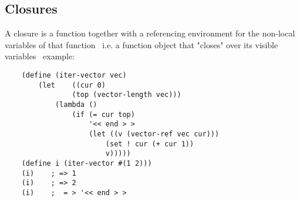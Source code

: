 \subsection{Closures}
A closure is a function together with a referencing environment for the
non-local variables of that function \
i.e. a function object that "closes" over its visible variables \
example:
\begin{lstlisting}
    (define (iter-vector vec)
        (let    ((cur 0)
                (top (vector-length vec)))
            (lambda ()
                (if (= cur top)
                    '<< end > >
                    (let ((v (vector-ref vec cur)))
                        (set ! cur (+ cur 1))
                        v)))))
    (define i (iter-vector #(1 2)))
    (i)    ; => 1
    (i)    ; => 2
    (i)    ;  = > '<< end > >
\end{lstlisting}


